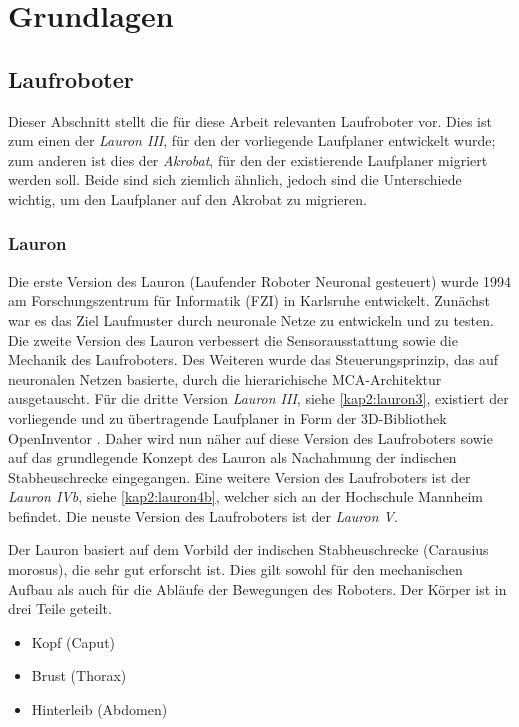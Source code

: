 \chapter{Grundlagen}
\label{kap2}

\section{Laufroboter}

Dieser Abschnitt stellt die für diese Arbeit relevanten Laufroboter vor. Dies ist zum einen der \emph{Lauron III}, für den der vorliegende Laufplaner entwickelt wurde; zum anderen ist dies der \emph{Akrobat}, für den der existierende Laufplaner migriert werden soll. Beide sind sich ziemlich ähnlich, jedoch sind die Unterschiede wichtig, um den Laufplaner auf den Akrobat zu migrieren. 

\subsection{Lauron}

Die erste Version des Lauron (Laufender Roboter Neuronal gesteuert) wurde 1994 am Forschungszentrum für Informatik (FZI) in Karlsruhe \autocite{fzi} entwickelt. Zunächst war es das Ziel Laufmuster durch neuronale Netze zu entwickeln und zu testen. Die zweite Version des Lauron verbessert die Sensorausstattung sowie die Mechanik des Laufroboters. Des Weiteren wurde das Steuerungsprinzip, das auf neuronalen Netzen basierte, durch die hierarichische MCA-Architektur \autocite{scholl2001modular} ausgetauscht. Für die dritte Version \emph{Lauron III}, siehe \autoref{kap2:lauron3}, existiert der vorliegende und zu übertragende Laufplaner in Form der 3D-Bibliothek OpenInventor \autocite{inventor}. Daher wird nun näher auf diese Version des Laufroboters sowie auf das grundlegende Konzept des Lauron als Nachahmung der indischen Stabheuschrecke eingegangen. Eine weitere Version des Laufroboters ist der \emph{Lauron IVb}, siehe \autoref{kap2:lauron4b}, welcher sich an der Hochschule Mannheim befindet. Die neuste Version des Laufroboters ist der \emph{Lauron V}.

Der Lauron basiert auf dem Vorbild der indischen Stabheuschrecke (Carausius morosus), die sehr gut erforscht ist. Dies gilt sowohl für den mechanischen Aufbau als auch für die Abläufe der Bewegungen des Roboters. Der Körper ist in drei Teile geteilt.
\begin{itemize}
  \item Kopf (Caput)
  \item Brust (Thorax)
  \item Hinterleib (Abdomen)
\end{itemize}

